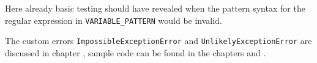 Here already basic testing should have revealed when the pattern syntax for the regular expression in \lstinline|VARIABLE_PATTERN| would be invalid.

\bigskip

The custom errors \lstinline|ImpossibleExceptionError| and \lstinline|UnlikelyExceptionError| are discussed in chapter , sample code can be found in the chapters  and .


